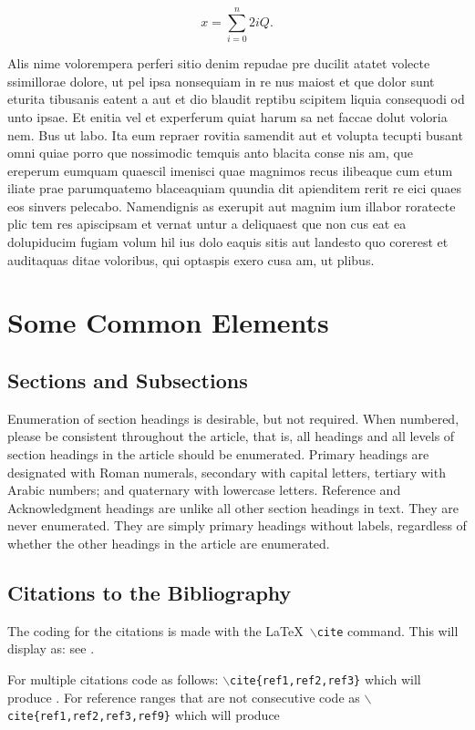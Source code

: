 \documentclass[lettersize,journal]{IEEEtran}
\begin{document}
\begin{equation}
\label{deqn_ex1a}
x = \sum_{i=0}^{n} 2{i} Q.
\end{equation}

Alis nime volorempera perferi sitio denim repudae pre ducilit atatet volecte ssimillorae dolore, ut pel ipsa nonsequiam in re nus maiost et que dolor sunt eturita tibusanis eatent a aut et dio blaudit reptibu scipitem liquia consequodi od unto ipsae. Et enitia vel et experferum quiat harum sa net faccae dolut voloria nem. Bus ut labo. Ita eum repraer rovitia samendit aut et volupta tecupti busant omni quiae porro que nossimodic temquis anto blacita conse nis am, que ereperum eumquam quaescil imenisci quae magnimos recus ilibeaque cum etum iliate prae parumquatemo blaceaquiam quundia dit apienditem rerit re eici quaes eos sinvers pelecabo. Namendignis as exerupit aut magnim ium illabor roratecte plic tem res apiscipsam et vernat untur a deliquaest que non cus eat ea dolupiducim fugiam volum hil ius dolo eaquis sitis aut landesto quo corerest et auditaquas ditae voloribus, qui optaspis exero cusa am, ut plibus.


\section{Some Common Elements}
\subsection{Sections and Subsections}
Enumeration of section headings is desirable, but not required. When numbered, please be consistent throughout the article, that is, all headings and all levels of section headings in the article should be enumerated. Primary headings are designated with Roman numerals, secondary with capital letters, tertiary with Arabic numbers; and quaternary with lowercase letters. Reference and Acknowledgment headings are unlike all other section headings in text. They are never enumerated. They are simply primary headings without labels, regardless of whether the other headings in the article are enumerated. 

\subsection{Citations to the Bibliography}
The coding for the citations is made with the \LaTeX\ $\backslash${\tt{cite}} command. 
This will display as: see \cite{ref1}.

For multiple citations code as follows: {\tt{$\backslash$cite\{ref1,ref2,ref3\}}}
 which will produce \cite{ref1,ref2,ref3}. For reference ranges that are not consecutive code as {\tt{$\backslash$cite\{ref1,ref2,ref3,ref9\}}} which will produce  \cite{ref1,ref2,ref3,ref9}
\end{document}
